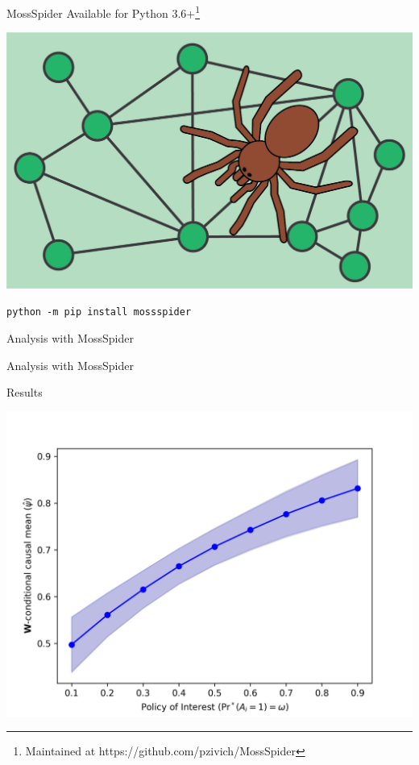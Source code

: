 \documentclass{beamer}
\begin{document}
\begin{frame}{MossSpider}
	Available for Python 3.6+\footnote[frame]{Maintained at https://github.com/pzivich/MossSpider}\\
	\begin{center}
		\includegraphics[scale=0.75]{images/mossspider_header.png}
	\end{center}
	\texttt{python -m pip install mossspider}
\end{frame}

\begin{frame}{Analysis with MossSpider}

\end{frame}

\begin{frame}{Analysis with MossSpider}
\end{frame}

\begin{frame}{Results}
	\begin{center}
		\includegraphics[scale=0.65]{images/example_results.png}
	\end{center}
\end{frame}
\end{document}
